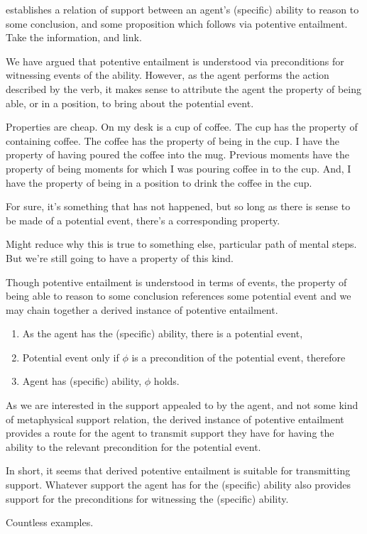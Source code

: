 \begin{note}[Attribution]
  \AR{} establishes a relation of support between an agent's (specific) ability to reason to some conclusion, and some proposition which follows via potentive entailment.
  Take the information, and link.

  We have argued that potentive entailment is understood via preconditions for witnessing events of the ability.
  However, as the agent performs the action described by the verb, it makes sense to attribute the agent the property of being able, or in a position, to bring about the potential event.

  Properties are cheap.
  On my desk is a cup of coffee.
  The cup has the property of containing coffee.
  The coffee has the property of being in the cup.
  I have the property of having poured the coffee into the mug.
  Previous moments have the property of being moments for which I was pouring coffee in to the cup.
  And, I have the property of being in a position to drink the coffee in the cup.

  For sure, it's something that has not happened, but so long as there is sense to be made of a potential event, there's a corresponding property.

  Might reduce why this is true to something else, particular path of mental steps.
  But we're still going to have a property of this kind.

  Though potentive entailment is understood in terms of events, the property of being able to reason to some conclusion references some potential event and we may chain together a derived instance of potentive entailment.
  \begin{enumerate}
  \item As the agent has the (specific) ability, there is a potential event,
  \item Potential event only if \(\phi\) is a precondition of the potential event, therefore
  \item Agent has (specific) ability, \(\phi\) holds.
  \end{enumerate}
  As we are interested in the support appealed to by the agent, and not {\color{red} some kind of metaphysical} support relation, the derived instance of potentive entailment provides a route for the agent to transmit support they have for having the ability to the relevant precondition for the potential event.

  In short, it seems that derived potentive entailment is suitable for transmitting support.
  Whatever support the agent has for the (specific) ability also provides support for the preconditions for witnessing the (specific) ability.

  Countless examples.
\end{note}

